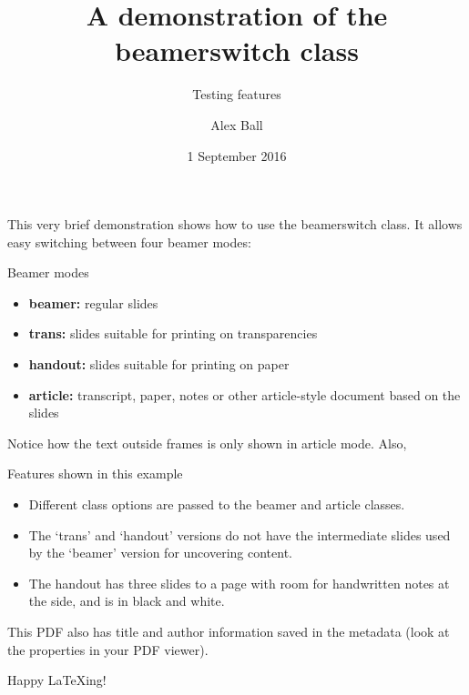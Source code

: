 \documentclass[%
  beameroptions={ignorenonframetext,14pt},
  articleoptions={a4paper,12pt},
  also={trans,handout,article}]{beamerswitch}
\title{A demonstration of the \textsf{beamerswitch} class}
\subtitle{Testing features}
\author{Alex Ball\inst{1}}
\institute{\inst{1}University of Life}
\date{1 September 2016}
\begin{document}
  \begin{frame}
    \maketitle
  \end{frame}

  This very brief demonstration shows how to use the \textsf{beamerswitch} class.
  It allows easy switching between four \textsf{beamer} modes:

  \begin{frame}{Beamer modes}
    \begin{itemize}[<+->]
      \item \textbf{beamer:} regular slides
      \item \textbf{trans:} slides suitable for printing on transparencies
      \item \textbf{handout:} slides suitable for printing on paper
      \item \textbf{article:} transcript, paper, notes or other article-style
        document based on the slides
    \end{itemize}
  \end{frame}

  Notice how the text outside frames is only shown in article mode. Also,

  \begin{frame}{Features shown in this example}
    \begin{itemize}[<+->]
      \item Different class options are passed to the \textsf{beamer} and
        \textsf{article} classes.
      \item The `trans' and `handout' versions do not have the intermediate
        slides used by the `beamer' version for uncovering content.
      \item The handout has three slides to a page with room for handwritten
        notes at the side, and is in black and white.
    \end{itemize}

  \end{frame}

  This PDF also has title and author information saved in the metadata (look
  at the properties in your PDF viewer).

  Happy {\LaTeX}ing!
\end{document}
